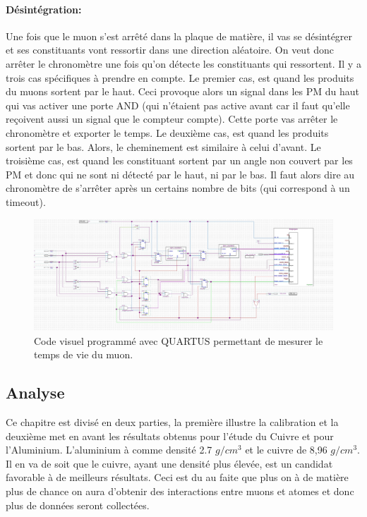 \documentclass[12pt]{article}
\begin{document}
\paragraph{Désintégration:}
Une fois que le muon s'est arrêté dans la plaque de matière, il vas se désintégrer et ses constituants vont ressortir dans une direction aléatoire. On veut donc arrêter le chronomètre une fois qu'on détecte les constituants qui ressortent. Il y a trois cas spécifiques à prendre en compte. Le premier cas, est quand les produits du muons sortent par le haut. Ceci provoque alors un signal dans les PM du haut qui vas activer une porte AND (qui n'étaient pas active avant car il faut qu'elle reçoivent aussi un signal que le compteur compte). Cette porte vas arrêter le chronomètre et exporter le temps. Le deuxième cas, est quand les produits sortent par le bas. Alors, le cheminement est similaire à celui d'avant. Le troisième cas, est quand les constituant sortent par un angle non couvert par les PM et donc qui ne sont ni détecté par le haut, ni par le bas. Il faut alors dire au chronomètre de s'arrêter après un certains nombre de bits (qui correspond à un timeout).

\begin{figure}[!ht]
    \centering
    \includegraphics[width=1\textwidth]{Images/Schemas/Quartus.jpg}
    \caption{Code visuel programmé avec QUARTUS permettant de mesurer le temps de vie du muon.}
    \label{fig:Quartus}
\end{figure}

\subsection{Analyse}

Ce chapitre est divisé en deux parties, la première illustre la calibration et la deuxième met en avant les résultats obtenus pour l'étude du Cuivre et pour l'Aluminium.
L'aluminium à comme densité 2.7 $g/cm^{3}$ et le cuivre de 8,96 $g/cm^{3}$. Il en va de soit que le cuivre, ayant une densité plus élevée, est un candidat favorable à de meilleurs résultats. Ceci est du au faite que plus on à de matière plus de chance on aura d'obtenir des interactions entre muons et atomes et donc plus de données seront collectées. 
\end{document}

